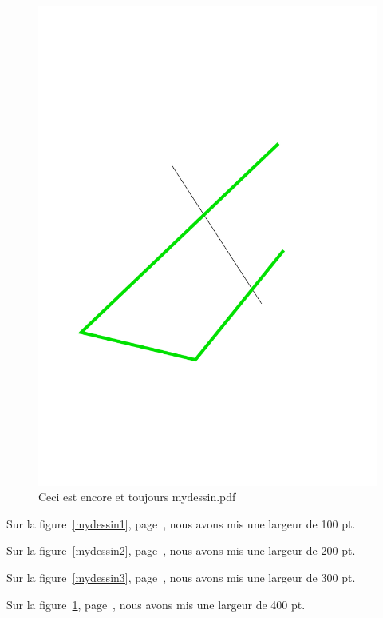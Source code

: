\documentclass[french]{article}
\begin{document}
\begin{figure}[!h]
\centering
\includegraphics[width=400pt]{mydessin.pdf}
\caption{Ceci est encore et toujours mydessin.pdf}
\label{mydessin4}
\end{figure}

Sur la figure~\ref{mydessin1}, page~\pageref{mydessin1}, nous avons mis une largeur de 100 pt.

Sur la figure~\ref{mydessin2}, page~\pageref{mydessin2}, nous avons mis une largeur de 200 pt.

Sur la figure~\ref{mydessin3}, page~\pageref{mydessin3}, nous avons mis une largeur de 300 pt.

Sur la figure~\ref{mydessin4}, page~\pageref{mydessin4}, nous avons mis une largeur de 400 pt.

\listoffigures
\end{document}
